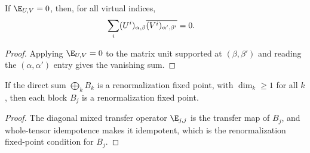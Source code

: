 \begin{lemma}%
    \label{lem:residual_isometry_entry}
    \leanok
    If $\E_{U,V}=0$, then, for all virtual indices,
    \begin{align}
        \sum_i(U^i)_{\alpha,\beta}
        \overline{(V^i)_{\alpha',\beta'}}
         & =0.
        \notag
    \end{align}
\end{lemma}
\begin{proof}\leanok
    Applying $\E_{U,V}=0$ to the matrix unit supported at $(\beta,\beta')$ and
    reading the $(\alpha,\alpha')$ entry gives the vanishing sum.
\end{proof}

\begin{lemma}%
    \label{lem:isrfp_block_of_rfp_direct_sum}
    \leanok
    If the direct sum $\bigoplus_k B_k$ is a renormalization fixed point, with
    $\dim_k\ge1$ for all $k$, then each block $B_j$ is a renormalization fixed
    point.
\end{lemma}
\begin{proof}\leanok
    The diagonal mixed transfer operator $\E_{j,j}$ is the transfer map of
    $B_j$, and whole-tensor idempotence makes it idempotent, which is the
    renormalization fixed-point condition for $B_j$.
\end{proof}


